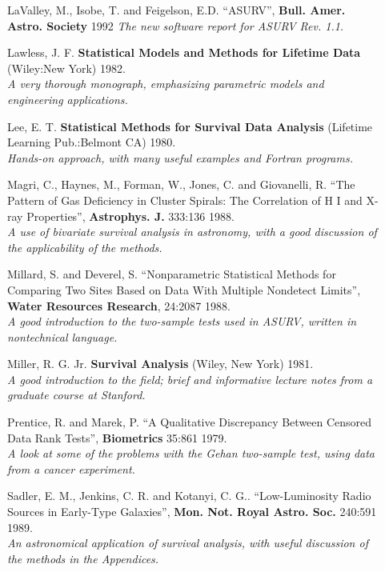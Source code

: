 \begin{description}
\item [] LaValley, M., Isobe, T. and Feigelson, E.D. ``ASURV'', {\bf Bull.
    Amer. Astro. Society} 1992
    {\it The new software report for ASURV Rev. 1.1.}

\item [] Lawless, J. F. {\bf Statistical Models and Methods for Lifetime Data}
    (Wiley:New York) 1982.\\
    {\it A very thorough monograph, emphasizing parametric models and
    engineering applications.}

\item [] Lee, E. T. {\bf Statistical Methods for Survival Data Analysis}
    (Lifetime Learning Pub.:Belmont CA) 1980.\\
    {\it Hands-on approach, with many useful examples and Fortran programs.}

\item [] Magri, C., Haynes, M., Forman, W., Jones, C. and Giovanelli, R.
    ``The Pattern of Gas Deficiency in Cluster Spirals: The Correlation of
    H I and X-ray Properties'', {\bf Astrophys. J.} 333:136 1988. \\
    {\it A use of bivariate survival analysis in astronomy, with a
    good discussion of the applicability of the methods.}

\item [] Millard, S. and Deverel, S. ``Nonparametric Statistical Methods for
    Comparing Two Sites Based on Data With Multiple Nondetect Limits'',
    {\bf Water Resources Research}, 24:2087 1988. \\
    {\it A good introduction to the two-sample tests used in ASURV, written
    in nontechnical language.}

\item [] Miller, R. G. Jr. {\bf Survival Analysis} (Wiley, New York) 1981.\\
    {\it A good introduction to the field; brief and informative lecture notes
    from a graduate course at Stanford.}

\item [] Prentice, R. and Marek, P. ``A Qualitative Discrepancy Between 
    Censored Data Rank Tests'', {\bf Biometrics} 35:861 1979. \\
    {\it A look at some of the problems with the Gehan two-sample test, using
    data from a cancer experiment.}

\item[] Sadler, E. M., Jenkins, C. R.  and Kotanyi, C. G..
    ``Low-Luminosity Radio Sources in Early-Type Galaxies'', 
    {\bf Mon. Not. Royal Astro. Soc.} 240:591 1989. \\
    {\it An astronomical application of survival analysis, with 
    useful discussion of the methods in the Appendices.}


\end{description}
